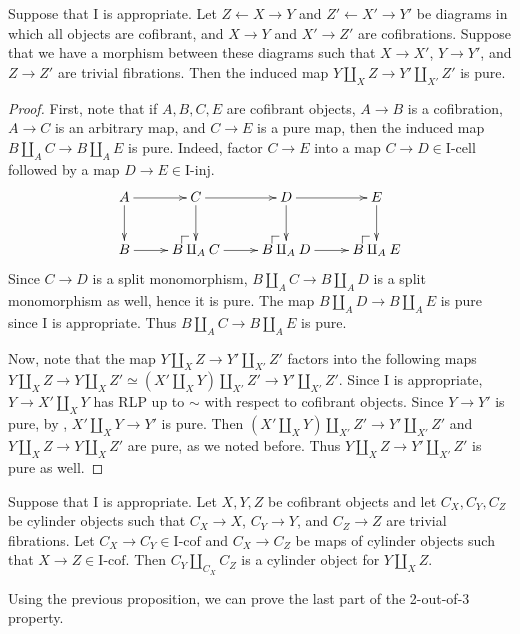 \documentclass{amsart}
\makeatletter
\theoremstyle{definition}
\newcommand{\I}{\mathrm{I}}
\newcommand{\class}[2]{#1\text{-}\mathrm{#2}}
\newcommand{\Iinj}[1][\I]{\class{#1}{inj}}
\newcommand{\Icell}[1][\I]{\class{#1}{cell}}
\newcommand{\Icof}[1][\I]{\class{#1}{cof}}
\newcommand{\po}[1][dr]{\save*!/#1+1.2pc/#1:(1,-1)@^{|-}\restore}
\makeatother
\begin{document}
\begin{prop}
Suppose that $\I$ is appropriate.
Let $Z \leftarrow X \to Y$ and $Z' \leftarrow X' \to Y'$ be diagrams in which
all objects are cofibrant, and $X \to Y$ and $X' \to Z'$ are cofibrations.
Suppose that we have a morphism between these diagrams such that $X \to X'$, $Y \to Y'$, and $Z \to Z'$ are trivial fibrations.
Then the induced map $Y \amalg_X Z \to Y' \amalg_{X'} Z'$ is pure.
\end{prop}
\begin{proof}
First, note that if $A,B,C,E$ are cofibrant objects, $A \to B$ is a cofibration, $A \to C$ is an arbitrary map, and
$C \to E$ is a pure map, then the induced map $B \amalg_A C \to B \amalg_A E$ is pure.
Indeed, factor $C \to E$ into a map $C \to D \in \Icell$ followed by a map $D \to E \in \Iinj$.
\[ \xymatrix{ A \ar[r] \ar[d] &     C \ar[d]     \ar[r] &     D \ar[d]     \ar[r] &     E \ar[d] \\
              B \ar[r]        & \po B \amalg_A C \ar[r] & \po B \amalg_A D \ar[r] & \po B \amalg_A E
            } \]
Since $C \to D$ is a split monomorphism, $B \amalg_A C \to B \amalg_A D$ is a split monomorphism as well, hence it is pure.
The map $B \amalg_A D \to B \amalg_A E$ is pure since $\I$ is appropriate.
Thus $B \amalg_A C \to B \amalg_A E$ is pure.

Now, note that the map $Y \amalg_X Z \to Y' \amalg_{X'} Z'$ factors into the following maps
$Y \amalg_X Z \to Y \amalg_X Z' \simeq (X' \amalg_X Y) \amalg_{X'} Z' \to Y' \amalg_{X'} Z'$.
Since $\I$ is appropriate, $Y \to X' \amalg_X Y$ has RLP up to $\sim$ with respect to cofibrant objects.
Since $Y \to Y'$ is pure, by , $X' \amalg_X Y \to Y'$ is pure.
Then $(X' \amalg_X Y) \amalg_{X'} Z' \to Y' \amalg_{X'} Z'$ and $Y \amalg_X Z \to Y \amalg_X Z'$ are pure, as we noted before.
Thus $Y \amalg_X Z \to Y' \amalg_{X'} Z'$ is pure as well.
\end{proof}

\begin{cor}
Suppose that $\I$ is appropriate.
Let $X,Y,Z$ be cofibrant objects and let $C_X,C_Y,C_Z$ be cylinder objects
such that $C_X \to X$, $C_Y \to Y$, and $C_Z \to Z$ are trivial fibrations.
Let $C_X \to C_Y \in \Icof$ and $C_X \to C_Z$ be maps of cylinder objects such that $X \to Z \in \Icof$.
Then $C_Y \amalg_{C_X} C_Z$ is a cylinder object for $Y \amalg_X Z$.
\end{cor}

Using the previous proposition, we can prove the last part of the 2-out-of-3 property.
\end{document}
